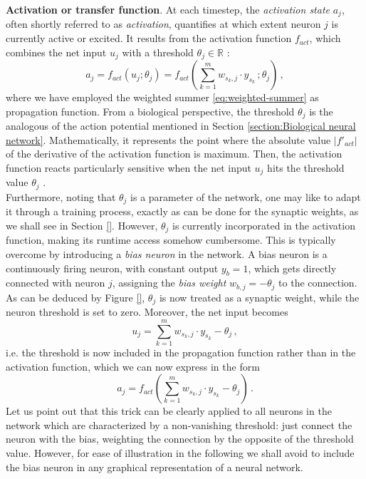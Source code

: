 \documentclass[11pt, a4paper]{report}
\numberwithin{equation}{chapter}
\theoremstyle{theorem}
\theoremstyle{definition}
\numberwithin{figure}{section}
\begin{document}
		\noindent \textbf{Activation or transfer function}. At each timestep, the \emph{activation state} $a_j$, often shortly referred to as \emph{activation}, quantifies at which extent neuron $j$ is currently active or excited. It results from the activation function $f_{act}$, which combines the net input $u_j$ with a threshold $\theta_j \in \mathbb{R}$ \cite{Kri}: 
		\begin{equation}
			\label{eq:activation-function}
			a_j = f_{act}(u_j; \theta_j) = f_{act}(\sum_{k = 1}^m w_{s_k,j} \cdot y_{s_k} \, ; \theta_j) \, ,
		\end{equation}
		where we have employed the weighted summer \eqref{eq:weighted-summer} as propagation function. From a biological perspective, the threshold $\theta_j$ is the analogous of the action potential mentioned in Section \ref{section:Biological neural network}. Mathematically, it represents the point where the absolute value $|f'_{act}|$ of the derivative of the activation function is maximum. Then, the activation function reacts particularly sensitive when the net input $u_j$ hits the threshold value $\theta_j$ \cite{Kri}. \\
		Furthermore, noting that $\theta_j$ is a parameter of the network, one may like to adapt it through a training process, exactly as can be done for the synaptic weights, as we shall see in Section \ref{}. However, $\theta_j$ is currently incorporated in the activation function, making its runtime access somehow cumbersome. This is typically overcome by introducing a \emph{bias neuron} in the network. A bias neuron is a continuously firing neuron, with constant output $y_{b} = 1$, which gets directly connected with neuron $j$, assigning the \emph{bias weight} $w_{b,j} = - \theta_j$ to the connection. As can be deduced by Figure \ref{}, $\theta_j$ is now treated as a synaptic weight, while the neuron threshold is set to zero. Moreover, the net input becomes
		\begin{equation}
			\label{eq:net-input}
			u_j = \sum_{k = 1}^m w_{s_k,j} \cdot y_{s_k} - \theta_j \, ,
		\end{equation}
		i.e. the threshold is now included in the propagation function rather than in the activation function, which we can now express in the form
		\begin{equation}
			a_j = f_{act}(\sum_{k = 1}^m w_{s_k,j} \cdot y_{s_k} - \theta_j) \, .
		\end{equation}
		Let us point out that this trick can be clearly applied to all neurons in the network which are characterized by a non-vanishing threshold: just connect the neuron with the bias, weighting the connection by the opposite of the threshold value. However, for ease of illustration in the following we shall avoid to include the bias neuron in any graphical representation of a neural network.
		
\end{document}
